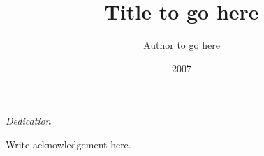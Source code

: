 

\clearpage{}  %



\title{Title to go here}
\author{Author to go here}
\date{2007}
\maketitle

\copyrightpage

\begin{dedication}
\textit{Dedication}
\end{dedication}


\begin{acknowledgments}
Write acknowledgement here.
\end{acknowledgments}

\tableofcontents
\listoftables
\listoffigures


